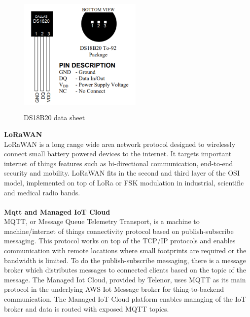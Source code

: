 		\begin{figure}[h]
			\caption{DS18B20 data sheet}
			\includegraphics[width=6cm, height=6cm]{tempsensordatasheet}
		\end{figure}
		\textbf{LoRaWAN} \\
		LoRaWAN is a long range wide area network protocol designed to wirelessly connect small battery powered devices to the internet. It targets important internet of things features such as bi-directional communication, end-to-end security and mobility. LoRaWAN fits in the second and third layer of the OSI model, implemented on top of LoRa or FSK modulation in industrial, scientific and medical radio bands\cite{LoRaWAN}.
		\\\\
		\textbf{Mqtt and Managed IoT Cloud} \\
		MQTT, or Message Queue Telemetry Transport, is a machine to machine/internet of things connectivity protocol based on publish-subscribe messaging. This protocol works on top of the TCP/IP protocols and enables communication with remote locations where small footprints are required or the bandwidth is limited. To do the publish-subscribe messaging, there is a message broker which distributes messages to connected clients based on the topic of the message\cite{wikiMQTT}. The Managed Iot Cloud, provided by Telenor, uses MQTT as its main protocol in the underlying AWS Iot Message broker for thing-to-backend communication. The Managed IoT Cloud platform enables managing of the IoT broker and data is routed with exposed MQTT topics\cite{telenorIOT}.
		
		
		
